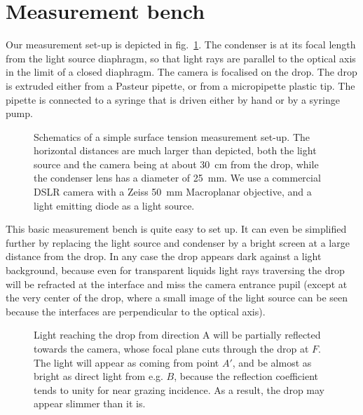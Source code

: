 \documentclass[fleqn]{scrartcl}
\begin{document}
\section{Measurement bench}
\label{sec:bench}

Our measurement set-up is depicted in fig.~\ref{fig:setup}. The
condenser is at its focal length from the light source diaphragm, so
that light rays are parallel to the optical axis in the limit of a
closed diaphragm. The camera is focalised on the drop. The drop is
extruded either from a Pasteur pipette, or from a micropipette plastic
tip. The pipette is connected to a syringe that is driven either by
hand or by a syringe pump.

\begin{figure}
  \centering
  
  
  \caption{Schematics of a simple surface tension measurement set-up.
    The horizontal distances are much larger than depicted, both the
    light source and the camera being at about \SI{30}{\centi\metre}
    from the drop, while the condenser lens has a diameter of
    \SI{25}{\milli\metre}. We use a commercial DSLR camera with a
    Zeiss \SI{50}{\milli\metre} Macroplanar objective, and a light
    emitting diode as a light source.}
  \label{fig:setup}
\end{figure}

This basic measurement bench is quite easy to set up. It can even be
simplified further by replacing the light source and condenser by a
bright screen at a large distance from the drop. In any case the drop
appears dark against a light background, because even for transparent
liquids light rays traversing the drop will be refracted at the
interface and miss the camera entrance pupil (except at the very
center of the drop, where a small image of the light source can be
seen because the interfaces are perpendicular to the optical axis). 

\begin{figure}
  \centering
  
  \caption{Light reaching the drop from direction A will be partially
    reflected towards the camera, whose focal plane cuts through the
    drop at $F$. The light will appear as coming from point $A'$, and
    be almost as bright as direct light from e.g. $B$, because the
    reflection coefficient tends to unity for near grazing incidence.
    As a result, the drop may appear slimmer than it is.}
  \label{fig:grazing}
\end{figure}
\end{document}
